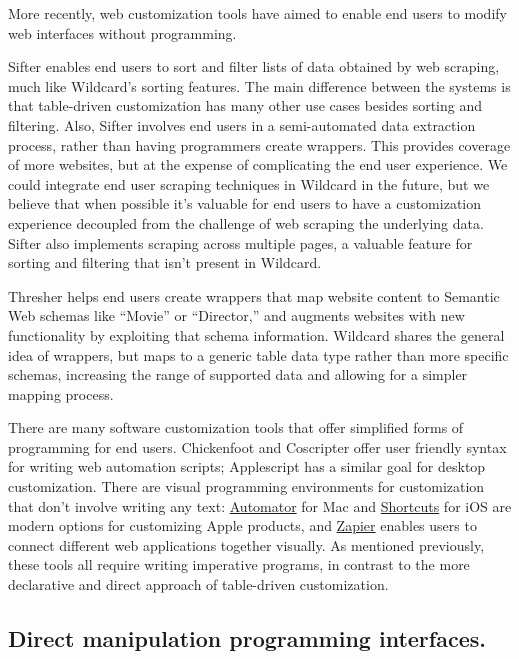 \documentclass[sigplan,screen,10pt,anonymous,review]{acmart}
\begin{document}
More recently, web customization tools have aimed to enable end users to
modify web interfaces without programming.

Sifter \citep{huynh2006} enables end users to sort and filter lists of
data obtained by web scraping, much like Wildcard's sorting features.
The main difference between the systems is that table-driven
customization has many other use cases besides sorting and filtering.
Also, Sifter involves end users in a semi-automated data extraction
process, rather than having programmers create wrappers. This provides
coverage of more websites, but at the expense of complicating the end
user experience. We could integrate end user scraping techniques in
Wildcard in the future, but we believe that when possible it's valuable
for end users to have a customization experience decoupled from the
challenge of web scraping the underlying data. Sifter also implements
scraping across multiple pages, a valuable feature for sorting and
filtering that isn't present in Wildcard.

Thresher \citep{hogue2005} helps end users create wrappers that map
website content to Semantic Web schemas like ``Movie'' or ``Director,''
and augments websites with new functionality by exploiting that schema
information. Wildcard shares the general idea of wrappers, but maps to a
generic table data type rather than more specific schemas, increasing
the range of supported data and allowing for a simpler mapping process.

There are many software customization tools that offer simplified forms
of programming for end users. Chickenfoot \citep{bolin2005} and
Coscripter \citep{leshed2008} offer user friendly syntax for writing web
automation scripts; Applescript \citep{cook2007} has a similar goal for
desktop customization. There are visual programming environments for
customization that don't involve writing any text:
\href{https://support.apple.com/guide/automator/welcome/mac}{Automator}
for Mac and
\href{https://apps.apple.com/us/app/shortcuts/id915249334}{Shortcuts}
for iOS are modern options for customizing Apple products, and
\href{https://zapier.com/}{Zapier} enables users to connect different
web applications together visually. As mentioned previously, these tools
all require writing imperative programs, in contrast to the more
declarative and direct approach of table-driven customization.

\hypertarget{direct-manipulation-programming-interfaces.}{%
\subsection{Direct manipulation programming
interfaces.}\label{direct-manipulation-programming-interfaces.}}
\end{document}
